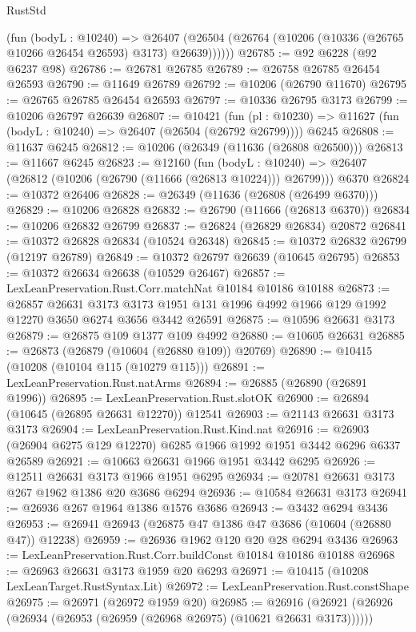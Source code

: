 \begin{lexlean}{RustStd}
\begin{coremodule}
        (fun (bodyL : @10240) =>
        @26407 (@26504 (@26764 (@10206 (@10336 (@26765 @10266 @26454 @26593) @3173) @26639))))))
@26785 := @92 @6228 (@92 @6237 @98)
@26786 := @26781 @26785
@26789 := @26758 @26785 @26454 @26593
@26790 := @11649 @26789
@26792 := @10206 (@26790 @11670)
@26795 := @26765 @26785 @26454 @26593
@26797 := @10336 @26795 @3173
@26799 := @10206 @26797 @26639
@26807 := @10421
    (fun (pl : @10230) => @11627 (fun (bodyL : @10240) => @26407 (@26504 (@26792 @26799))))
    @6245
@26808 := @11637 @6245
@26812 := @10206 (@26349 (@11636 (@26808 @26500)))
@26813 := @11667 @6245
@26823 := @12160
    (fun (bodyL : @10240) => @26407 (@26812 (@10206 (@26790 (@11666 (@26813 @10224))) @26799)))
    @6370
@26824 := @10372 @26406
@26828 := @26349 (@11636 (@26808 (@26499 @6370)))
@26829 := @10206 @26828
@26832 := @26790 (@11666 (@26813 @6370))
@26834 := @10206 @26832 @26799
@26837 := @26824 (@26829 @26834) @20872
@26841 := @10372 @26828 @26834 (@10524 @26348)
@26845 := @10372 @26832 @26799 (@12197 @26789)
@26849 := @10372 @26797 @26639 (@10645 @26795)
@26853 := @10372 @26634 @26638 (@10529 @26467)
@26857 := LexLeanPreservation.Rust.Corr.matchNat @10184 @10186 @10188
@26873 := @26857
    @26631
    @3173
    @3173
    @1951
    @131
    @1996
    @4992
    @1966
    @129
    @1992
    @12270
    @3650
    @6274
    @3656
    @3442
    @26591
@26875 := @10596 @26631 @3173
@26879 := @26875 @109 @1377 @109 @4992
@26880 := @10605 @26631
@26885 := @26873 (@26879 (@10604 (@26880 @109)) @20769)
@26890 := @10415 (@10208 (@10104 @115 (@10279 @115)))
@26891 := LexLeanPreservation.Rust.natArms
@26894 := @26885 (@26890 (@26891 @1996))
@26895 := LexLeanPreservation.Rust.slotOK
@26900 := @26894 (@10645 (@26895 @26631 @12270)) @12541
@26903 := @21143 @26631 @3173 @3173
@26904 := LexLeanPreservation.Rust.Kind.nat
@26916 := @26903 (@26904 @6275 @129 @12270) @6285 @1966 @1992 @1951 @3442 @6296 @6337 @26589
@26921 := @10663 @26631 @1966 @1951 @3442 @6295
@26926 := @12511 @26631 @3173 @1966 @1951 @6295
@26934 := @20781 @26631 @3173 @267 @1962 @1386 @20 @3686 @6294
@26936 := @10584 @26631 @3173
@26941 := @26936 @267 @1964 @1386 @1576 @3686
@26943 := @3432 @6294 @3436
@26953 := @26941 @26943 (@26875 @47 @1386 @47 @3686 (@10604 (@26880 @47)) @12238)
@26959 := @26936 @1962 @120 @20 @28 @6294 @3436
@26963 := LexLeanPreservation.Rust.Corr.buildConst @10184 @10186 @10188
@26968 := @26963 @26631 @3173 @1959 @20 @6293
@26971 := @10415 (@10208 LexLeanTarget.RustSyntax.Lit)
@26972 := LexLeanPreservation.Rust.constShape
@26975 := @26971 (@26972 @1959 @20)
@26985 := @26916 (@26921 (@26926 (@26934 (@26953 (@26959 (@26968 @26975) (@10621 @26631 @3173))))))

\end{coremodule}
\end{lexlean}
